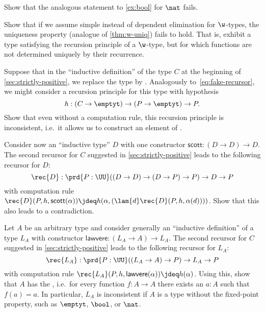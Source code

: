 \begin{ex}\label{ex:ind-nat-not-equiv}
  Show that the analogous statement to \cref{ex:bool} for $\nat$ fails.
\end{ex}

\begin{ex}\label{ex:no-dep-uniqueness-failure}
  Show that if we assume simple instead of dependent elimination for $\w$-types, the uniqueness property (analogue of \cref{thm:w-uniq}) fails to hold.
  That is, exhibit a type satisfying the recursion principle of a $\w$-type, but for which functions are not determined uniquely by their recurrence.
\end{ex}

\begin{ex}\label{ex:loop}
  Suppose that in the ``inductive definition'' of the type $C$ at the beginning of \cref{sec:strictly-positive}, we replace the type \nat by \emptyt.
  Analogously to~\eqref{eq:fake-recursor}, we might consider a recursion principle for this type with hypothesis
  \[ h:(C\to\emptyt) \to (P\to\emptyt) \to P. \]
  Show that even without a computation rule, this recursion principle is inconsistent, i.e.\ it allows us to construct an element of \emptyt.
\end{ex}

\begin{ex}\label{ex:loop2}
  Consider now an ``inductive type'' $D$ with one constructor $\mathsf{scott}:(D\to D) \to D$.
  The second recursor for $C$ suggested in \cref{sec:strictly-positive} leads to the following recursor for $D$:
  \[ \rec{D} : \prd{P:\UU} ((D\to D) \to (D\to P)\to P) \to D \to P \]
  with computation rule $\rec{D}(P,h,\mathsf{scott}(\alpha)) \jdeq h(\alpha,(\lam{d} \rec{D}(P,h,\alpha(d))))$.
  Show that this also leads to a contradiction.
\end{ex}

\begin{ex}\label{ex:inductive-lawvere}
  Let $A$ be an arbitrary type and consider generally an ``inductive definition'' of a type $L_A$ with constructor $\mathsf{lawvere}:(L_A\to A) \to L_A$.
  The second recursor for $C$ suggested in \cref{sec:strictly-positive} leads to the following recursor for $L_A$:
  \[ \rec{L_A} : \prd{P:\UU} ((L_A\to A) \to P) \to L_A\to P \]
  with computation rule $\rec{L_A}(P,h,\mathsf{lawvere}(\alpha)) \jdeq h(\alpha)$.
  Using this, show that $A$ has the , i.e.\ for every function $f:A\to A$ there exists an $a:A$ such that $f(a)=a$.
  In particular, $L_A$ is inconsistent if $A$ is a type without the fixed-point property, such as $\emptyt$, $\bool$, or $\nat$.
\end{ex}

